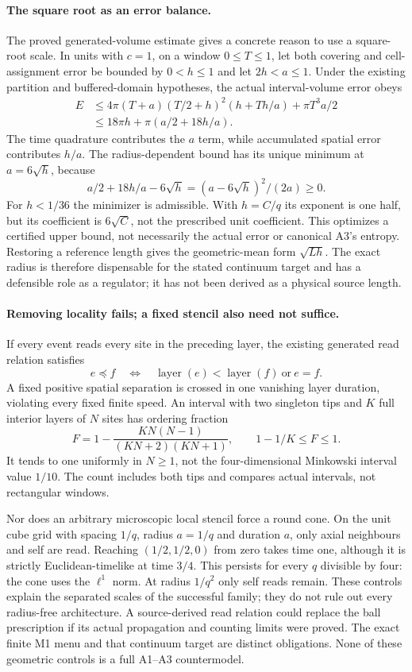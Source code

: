\paragraph{The square root as an error balance.}
The proved generated-volume estimate gives a concrete reason to use a
square-root scale. In units with $c=1$, on a window $0\leq T\leq1$, let
both covering and cell-assignment error be bounded by $0<h\leq1$ and
let $2h<a\leq1$. Under the existing partition and buffered-domain
hypotheses, the actual interval-volume error obeys
\begin{align*}
 E&\leq4\pi(T+a)(T/2+h)^2(h+Th/a)+\pi T^3a/2\\
  &\leq18\pi h+\pi(a/2+18h/a).
\end{align*}
The time quadrature contributes the $a$ term, while accumulated spatial
error contributes $h/a$. The radius-dependent bound has its unique
minimum at $a=6\sqrt h$, because
\[
 a/2+18h/a-6\sqrt h=(a-6\sqrt h)^2/(2a)\geq0.
\]
For $h<1/36$ the minimizer is admissible. With $h=C/q$ its exponent is
one half, but its coefficient is $6\sqrt C$, not the prescribed unit
coefficient. This optimizes a certified upper bound, not necessarily the
actual error or canonical A3's entropy. Restoring a reference length gives
the geometric-mean form $\sqrt{Lh}$. The exact radius is therefore
dispensable for the stated continuum target and has a defensible role as
a regulator; it has not been derived as a physical source length.

\paragraph{Removing locality fails; a fixed stencil also need not suffice.}
If every event reads every site in the preceding layer, the existing
generated read relation satisfies
\[
 e\preceq f\quad\Longleftrightarrow\quad
 \operatorname{layer}(e)<\operatorname{layer}(f)\ \text{or}\ e=f.
\]
A fixed positive spatial separation is crossed in one vanishing layer
duration, violating every fixed finite speed. An interval with two
singleton tips and $K$ full interior layers of $N$ sites has ordering
fraction
\[
 F=1-\frac{KN(N-1)}{(KN+2)(KN+1)},\qquad 1-1/K\leq F\leq1.
\]
It tends to one uniformly in $N\geq1$, not the four-dimensional
Minkowski interval value $1/10$. The count includes both tips and compares
actual intervals, not rectangular windows.

Nor does an arbitrary microscopic local stencil force a round cone.
On the unit cube grid with spacing $1/q$, radius $a=1/q$ and duration
$a$, only axial neighbours and self are read. Reaching $(1/2,1/2,0)$
from zero takes time one, although it is strictly Euclidean-timelike
at time $3/4$. This persists for every $q$ divisible by four: the cone
uses the $\ell^1$ norm. At radius $1/q^2$ only self reads remain.
These controls explain the separated scales of the successful family;
they do not rule out every radius-free architecture. A source-derived
read relation could replace the ball prescription if its actual
propagation and counting limits were proved. The exact finite M1 menu
and that continuum target are distinct obligations. None of these
geometric controls is a full A1--A3 countermodel.

